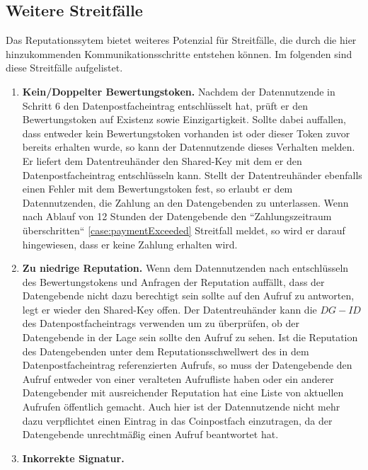 \documentclass[
	fontsize=12pt,
	headings=small,
	parskip=half,           %
	bibliography=totoc,
	numbers=noenddot,       %
	open=any,               %
]{scrreprt}
\begin{document}
\subsection{Weitere Streitfälle}
\label{subsec:repStreit}
Das Reputationssytem bietet weiteres Potenzial für Streitfälle, die durch die hier hinzukommenden Kommunikationsschritte entstehen können. Im folgenden sind diese Streitfälle aufgelistet.
\begin{enumerate}
    \item \textbf{Kein/Doppelter Bewertungstoken.} \label{case:badRepToken}
    Nachdem der Datennutzende in Schritt 6 den Datenpostfacheintrag entschlüsselt hat, prüft er den Bewertungstoken auf Existenz sowie Einzigartigkeit. Sollte dabei auffallen, dass entweder kein Bewertungstoken vorhanden ist oder dieser Token zuvor bereits erhalten wurde, so kann der Datennutzende dieses Verhalten melden. Er liefert dem Datentreuhänder den Shared-Key mit dem er den Datenpostfacheintrag entschlüsseln kann. Stellt der Datentreuhänder ebenfalls einen Fehler mit dem Bewertungstoken fest, so erlaubt er dem Datennutzenden, die Zahlung an den Datengebenden zu unterlassen. Wenn nach Ablauf von 12 Stunden der Datengebende den ``Zahlungszeitraum überschritten`` \ref{case:paymentExceeded} Streitfall meldet, so wird er darauf hingewiesen, dass er keine Zahlung erhalten wird.
    \item \textbf{Zu niedrige Reputation.} \label{case:insufficientRep}
    Wenn dem Datennutzenden nach entschlüsseln des Bewertungstokens und Anfragen der Reputation auffällt, dass der Datengebende nicht dazu berechtigt sein sollte auf den Aufruf zu antworten, legt er wieder den Shared-Key offen. Der Datentreuhänder kann die $DG-ID$ des Datenpostfacheintrags verwenden um zu überprüfen, ob der Datengebende in der Lage sein sollte den Aufruf zu sehen. Ist die Reputation des Datengebenden unter dem Reputationsschwellwert des in dem Datenpostfacheintrag referenzierten Aufrufs, so muss der Datengebende den Aufruf entweder von einer veralteten Aufrufliste haben oder ein anderer Datengebender mit ausreichender Reputation hat eine Liste von aktuellen Aufrufen öffentlich gemacht. Auch hier ist der Datennutzende nicht mehr dazu verpflichtet einen Eintrag in das Coinpostfach einzutragen, da der Datengebende unrechtmäßig einen Aufruf beantwortet hat.
    \item \textbf{Inkorrekte Signatur.} \label{case:badSignature}

\end{enumerate}
\end{document}
